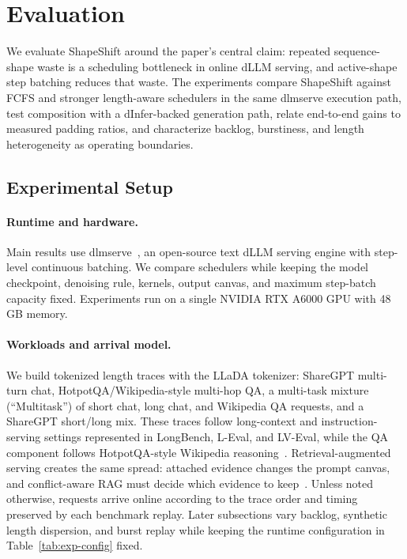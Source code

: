 \documentclass[a4paper]{llncs}
\begin{document}
\section{Evaluation}
\label{sec:evaluation}

We evaluate ShapeShift around the paper's central claim: repeated sequence-shape waste is a scheduling bottleneck in online dLLM serving, and active-shape step batching reduces that waste. The experiments compare ShapeShift against FCFS and stronger length-aware schedulers in the same dlmserve execution path, test composition with a dInfer-backed generation path, relate end-to-end gains to measured padding ratios, and characterize backlog, burstiness, and length heterogeneity as operating boundaries.

\subsection{Experimental Setup}

\paragraph{Runtime and hardware.}
Main results use dlmserve~\cite{dlmserve2026}, an open-source text dLLM serving engine with step-level continuous batching. We compare schedulers while keeping the model checkpoint, denoising rule, kernels, output canvas, and maximum step-batch capacity fixed. Experiments run on a single NVIDIA RTX A6000 GPU with 48\,GB memory.

\paragraph{Workloads and arrival model.}
We build tokenized length traces with the LLaDA tokenizer: ShareGPT multi-turn chat, HotpotQA\slash Wikipedia-style multi-hop QA, a multi-task mixture (``Multitask'') of short chat, long chat, and Wikipedia QA requests, and a ShareGPT short/long mix. These traces follow long-context and instruction-serving settings represented in LongBench, L-Eval, and LV-Eval, while the QA component follows HotpotQA-style Wikipedia reasoning~\cite{longbench2023,leval2023,lveval2024,hotpotqa2018}. Retrieval-augmented serving creates the same spread: attached evidence changes the prompt canvas, and conflict-aware RAG must decide which evidence to keep~\cite{ye2026seeing}. Unless noted otherwise, requests arrive online according to the trace order and timing preserved by each benchmark replay. Later subsections vary backlog, synthetic length dispersion, and burst replay while keeping the runtime configuration in Table~\ref{tab:exp-config} fixed.
\end{document}
